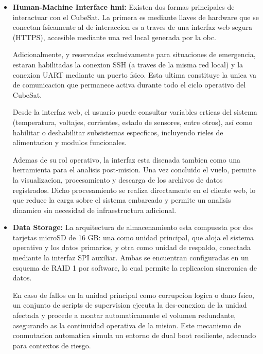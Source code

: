 \begin{itemize}
      \item \textbf{Human-Machine Interface \acrshort{hmi}:} Existen dos formas principales de interactuar con
        el CubeSat. La primera es mediante llaves de hardware que se conectan fsicamente al
        de interaccion es a traves de una interfaz web segura (HTTPS), accesible mediante una
        red local generada por la \acrshort{obc}.

        Adicionalmente, y reservadas exclusivamente para situaciones de emergencia, estaran
        habilitadas la conexion SSH (a traves de la misma red local) y la conexion UART
        mediante un puerto fsico. Esta ultima constituye la unica va de comunicacion que
        permanece activa durante todo el ciclo operativo del CubeSat.

        Desde la interfaz web, el usuario puede consultar variables crticas del sistema (temperatura, voltajes,
        corrientes, estado de sensores, entre otros), así como habilitar o
        deshabilitar subsistemas especficos, incluyendo rieles de alimentacion y modulos funcionales.

        Ademas de su rol operativo, la interfaz esta disenada tambien como una herramienta
        para el analisis post-mision. Una vez concluido el vuelo, permite la visualizacion, procesamiento
        y descarga de los archivos de datos registrados. Dicho procesamiento se realiza
        directamente en el cliente web, lo que reduce la carga sobre el sistema embarcado y
        permite un analisis dinamico sin necesidad de infraestructura adicional.

      \item \textbf{Data Storage:} La arquitectura de almacenamiento esta compuesta por dos tarjetas
        microSD de 16 GB: una como unidad principal, que aloja el sistema operativo y los
        datos primarios, y otra como unidad de respaldo, conectada mediante la interfaz SPI
        auxiliar. Ambas se encuentran configuradas en un esquema de RAID 1 por software,
        lo cual permite la replicacion sincronica de datos.

        En caso de fallos en la unidad principal
        como corrupcion logica o dano fsico, un conjunto de scripts de supervision ejecuta
        la des-conexion de la unidad afectada y procede a montar automaticamente el volumen
        redundante, asegurando as la continuidad operativa de la mision. Este mecanismo de
        conmutacion automatica simula un entorno de dual boot resiliente, adecuado para
        contextos de riesgo.


\end{itemize}
